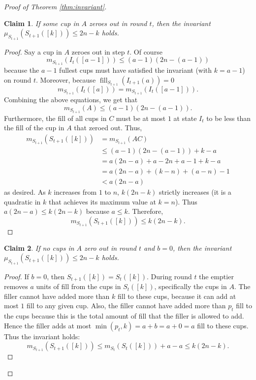 \documentclass[twocolumn]{article}[10pt]
\DeclareMathOperator{\fil}{\text{fill}}
\newtheorem{clm}{Claim}
\begin{document}
\begin{proof}[Proof of Theorem \ref{thm:invariant}]
\begin{clm}
  If some cup in $A$ zeroes out in round $t$, then the invariant
  $\mu_{S_{t+1}}(S_{t+1}([k])) \le 2n-k$ holds.
\end{clm}
\begin{proof}
  Say a cup in $A$ zeroes out in step $t$. 
  Of course
  $$m_{S_{t+1}}(I_t([a-1])) \le (a-1)(2n-(a-1))$$
  because the $a-1$ fullest cups must have satisfied the invariant (with $k = a - 1$) on round
  $t$. Moreover, because $\fil_{S_{t+1}}(I_{t+1}(a)) = 0$
  $$m_{S_{t+1}}(I_t([a])) = m_{S_{t+1}}(I_t([a-1])).$$
  Combining the above equations, we get that
  $$m_{S_{t+1}}(A) \le (a-1)(2n-(a-1)).$$
  Furthermore, the fill of all cups in $C$ must be at most $1$ at state $I_t$ to be
  less than the fill of the cup in $A$ that zeroed out. Thus, 
  \begin{align*}
      m_{S_{t+1}}(S_{t+1}([k])) & = m_{S_{t + 1}}(AC)\\ 
                                & \le (a-1)(2n-(a-1))+k-a\\
                                &= a(2n-a) +a -2n+a-1 + k -a\\
                                &= a(2n-a) + (k-n) + (a-n) -1\\
                                &< a(2n-a)
  \end{align*}
  as desired. As $k$ increases from $1$ to $n$, $k(2n-k)$ strictly increases (it is a
  quadratic in $k$ that achieves its maximum value at $k=n$).
  Thus $a(2n-a) \le k(2n-k)$ because $a\le k$.
  Therefore,
  $$m_{S_{t+1}}(S_{t+1}([k])) \le k(2n-k).$$
\end{proof}

\begin{clm}
  If no cups in $A$ zero out in round $t$ and $b=0$, then the invariant
  $\mu_{S_{t+1}}(S_{t+1}([k])) \le 2n-k$ holds.
\end{clm}
\begin{proof}
If $b=0$, then $S_{t+1}([k]) = S_t([k])$. 
During round $t$ the emptier removes $a$ units of fill from the cups in $S_t([k])$,
specifically the cups in $A$. The filler cannot have added more than $k$ fill
to these cups, because it can add at most $1$ fill to any given cup. Also, the
filler cannot have added more than $p_t$ fill to the cups because this is the
total amount of fill that the filler is allowed to add. Hence the filler adds
at most $\min(p_t, k) = a+b=a+0=a$ fill to these cups.
Thus the invariant holds:
$$m_{S_{t+1}}(S_{t+1}([k])) \le m_{S_t}(S_t([k]))+a-a \le k(2n-k).$$
\end{proof}


\end{proof}
\end{document}
